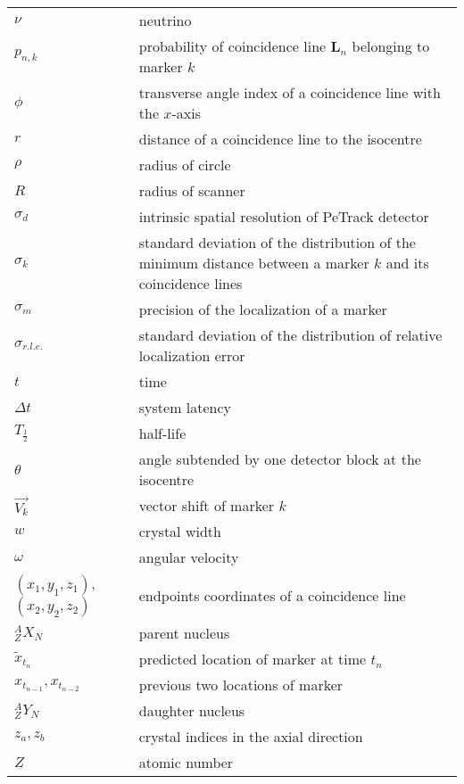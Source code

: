 \begin{longtable}{l p{10.5cm}}
$\nu$	&	neutrino	\\
$p_{n,k}$	&	probability of coincidence line $\mathbf{L}_{n}$ belonging to marker $k$	\\
$\phi$	&	transverse angle index of a coincidence line with the $x$-axis	\\
$r$	&	distance of a coincidence line to the isocentre	\\
$\rho$	&	radius of circle	\\
$R$	&	radius of scanner	\\
$\sigma_{d}$	&	intrinsic spatial resolution of PeTrack detector \\
$\sigma_{k}$	&	standard deviation of the distribution of the minimum distance between a marker $k$ and its coincidence lines	\\
$\sigma_{m}$	&	precision of the localization of a marker	\\
$\sigma_{r.l.e.}$	&	standard deviation of the distribution of relative localization error	\\
$t$	&	time	\\
$\Delta t$	&	system latency	\\
$T_{\frac{1}{2}}$	&	half-life	\\
$\theta$	&	angle subtended by one detector block at the isocentre	\\
$\vec{V_{k}}$	&	vector shift of marker $k$	\\
$w$	&	crystal width \\
$\omega$	&	angular velocity	\\
$(x_{1}, y_{1}, z_{1})$, $(x_{2}, y_{2}, z_{2})$	&	endpoints coordinates of a coincidence line	\\
${}^{A}_{Z}X_{N}$	&	parent nucleus	\\
$\tilde{x}_{t_{n}}$	&	predicted location of marker at time $t_{n}$	\\
$x_{t_{n-1}}, x_{t_{n-2}}$	&	previous two locations of marker	\\
${}^{A}_{Z}Y_{N}$	&	daughter nucleus	\\
$z_{a}, z_{b}$	&	crystal indices in the axial direction	\\
$Z$	&	atomic number \\
\hline
\end{longtable}

